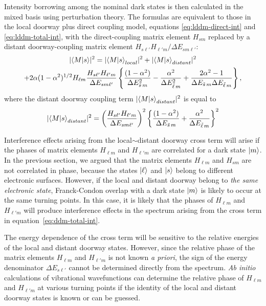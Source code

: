 \documentclass[12pt]{mitthesis}
\newcommand{\ts}{\tilde{s}\,}
\newcommand{\tl}{\tilde{\ell}\,}
\begin{document}
Intensity borrowing among the nominal dark states is then calculated
in the mixed basis using perturbation theory.  The formulas are
equivalent to those in the local doorway plus direct coupling model,
equations \ref{eq:lddm-direct-int} and \ref{eq:lddm-total-int}, with
the direct-coupling matrix element $H_{s m}$ replaced by a distant
doorway-coupling matrix element $H_{s\ell'} H_{\ell' m} / \Delta E_{s
  m \ell'}$:
\begin{multline}
  \label{eq:ddm-total-int}
    \lvert \braket{M|s} \rvert^2 =
    \lvert \braket{M|s}_{local} \rvert^2 + 
    \lvert \braket{M|s}_{distant} \rvert^2 \\
    + 2 \alpha (1-\alpha^2)^{1/2} H_{\ell m} 
    \frac{H_{s \ell'} H_{\ell' m}}{\Delta E_{s m \ell'}}
    \left \lbrace
      \frac{(1-\alpha^2)}{\Delta E_{\ts m}^2}
      - \frac{\alpha^2}{\Delta E_{\tl m}^2}
      + \frac{2\alpha^2 -1}{\Delta E_{\ts m} \Delta E_{\tl m}}
    \right \rbrace,
\end{multline}
where the distant doorway coupling term $\lvert \mathinner{\langle{M|s}\rangle}_{distant}
\rvert^2$ is equal to
\begin{equation}
  \label{eq:ddm-distant-int}
  \lvert \braket{M|s}_{distant} \rvert^2 = 
  \left (
    \frac{H_{s \ell'} H_{\ell' m}}{\Delta E_{s m \ell'}}
  \right )^2
  \left \lbrace
    \frac{(1 - \alpha^2)}{\Delta E_{\ts m}} +
    \frac{\alpha^2}{\Delta E_{\tl m}}
  \right \rbrace^2
\end{equation}

Interference effects arising from the local$\sim$distant doorway cross
term will arise if the phases of matrix elements $H_{\ell m}$ and
$H_{\ell' m}$ are correlated for a dark state $\mathinner{|{m}\rangle}$.  In the
previous section, we argued that the matrix elements $H_{\ell m}$ and
$H_{sm}$ are not correlated in phase, because the states $\mathinner{|{\ell}\rangle}$
and $\mathinner{|{s}\rangle}$ belong to different electronic surfaces.  However, if the
local and distant doorway belong to \emph{the same electronic state},
Franck-Condon overlap with a dark state $\mathinner{|{m}\rangle}$ is likely to occur
at the same turning points. In this case, it is likely that the
phases of $H_{\ell m}$ and $H_{\ell' m}$ will produce interference
effects in the spectrum arising from the cross term in
equation~\ref{eq:ddm-total-int}.  

The energy dependence of the cross term will be sensitive to the
relative energies of the local and distant doorway states.  However,
since the relative phase of the matrix elements $H_{\ell m}$ and
$H_{\ell' m}$ is not known \emph{a priori}, the sign of the energy
denominator $\Delta E_{s \ell'}$ cannot be determined directly from
the spectrum.  \emph{Ab initio} calculations of vibrational
wavefunctions can determine the relative phase of $H_{\ell m}$ and
$H_{\ell' m}$ at various turning points if the identity of the local
and distant doorway states is known or can be guessed.


 

\end{document}
